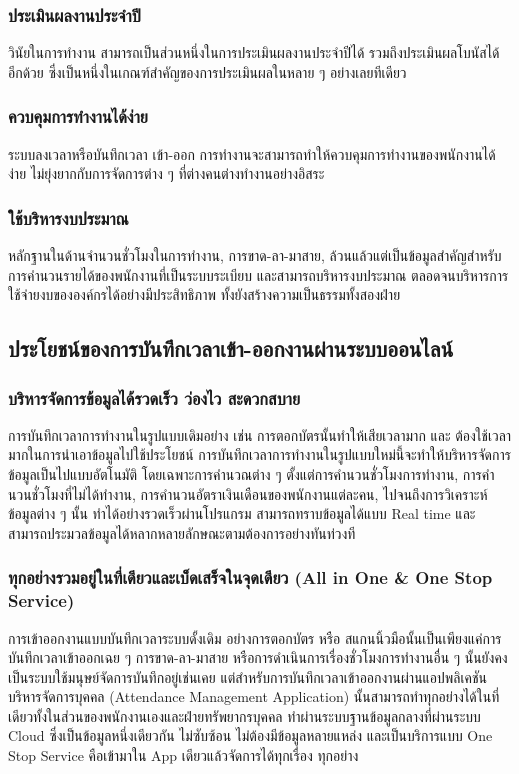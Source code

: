 \subsubsection{ประเมินผลงานประจำปี}
\quad วินัยในการทำงาน สามารถเป็นส่วนหนึ่งในการประเมินผลงานประจำปีได้ รวมถึงประเมินผลโบนัสได้อีกด้วย ซึ่งเป็นหนึ่งในเกณฑ์สำคัญของการประเมินผลในหลาย ๆ อย่างเลยทีเดียว 
\subsubsection{ควบคุมการทำงานได้ง่าย}
\quad ระบบลงเวลาหรือบันทึกเวลา เข้า-ออก การทำงานจะสามารถทำให้ควบคุมการทำงานของพนักงานได้ง่าย ไม่ยุ่งยากกับการจัดการต่าง ๆ ที่ต่างคนต่างทำงานอย่างอิสระ 
\subsubsection{ใช้บริหารงบประมาณ}
\quad หลักฐานในด้านจำนวนชั่วโมงในการทำงาน, การขาด-ลา-มาสาย, ล้วนแล้วแต่เป็นข้อมูลสำคัญสำหรับการคำนวนรายได้ของพนักงานที่เป็นระบบระเบียบ และสามารถบริหารงบประมาณ ตลอดจนบริหารการใช้จ่ายงบขององค์กรได้อย่างมีประสิทธิภาพ ทั้งยังสร้างความเป็นธรรมทั้งสองฝ่าย 

\subsection{ประโยชน์ของการบันทึกเวลาเข้า-ออกงานผ่านระบบออนไลน์}
\subsubsection{บริหารจัดการข้อมูลได้รวดเร็ว ว่องไว สะดวกสบาย}
\quad การบันทึกเวลาการทำงานในรูปแบบเดิมอย่าง เช่น การตอกบัตรนั้นทำให้เสียเวลามาก และ ต้องใช้เวลามากในการนำเอาข้อมูลไปใช้ประโยชน์ การบันทึกเวลาการทำงานในรูปแบบใหม่นี้จะทำให้บริหารจัดการข้อมูลเป็นไปแบบอัตโนมัติ โดยเฉพาะการคำนวณต่าง ๆ ตั้งแต่การคำนวนชั่วโมงการทำงาน, การคำนวนชั่วโมงที่ไม่ได้ทำงาน, การคำนวนอัตราเงินเดือนของพนักงานแต่ละคน, ไปจนถึงการวิเคราะห์ข้อมูลต่าง ๆ นั้น ทำได้อย่างรวดเร็วผ่านโปรแกรม สามารถทราบข้อมูลได้แบบ Real time และสามารถประมวลข้อมูลได้หลากหลายลักษณะตามต้องการอย่างทันท่วงที 
\subsubsection{ทุกอย่างรวมอยู่ในที่เดียวและเบ็ดเสร็จในจุดเดียว (All in One \& One Stop Service)}
\quad การเข้าออกงานแบบบันทึกเวลาระบบดั้งเดิม อย่างการตอกบัตร หรือ สแกนนิ้วมือนั้นเป็นเพียงแค่การบันทึกเวลาเข้าออกเฉย ๆ การขาด-ลา-มาสาย หรือการดำเนินการเรื่องชั่วโมงการทำงานอื่น ๆ นั้นยังคงเป็นระบบใช้มนุษย์จัดการบันทึกอยู่เช่นเคย แต่สำหรับการบันทึกเวลาเข้าออกงานผ่านแอปพลิเคชันบริหารจัดการบุคคล (Attendance Management Application) นั้นสามารถทำทุกอย่างได้ในที่เดียวทั้งในส่วนของพนักงานเองและฝ่ายทรัพยากรบุคคล ทำผ่านระบบฐานข้อมูลกลางที่ผ่านระบบ Cloud ซึ่งเป็นข้อมูลหนึ่งเดียวกัน ไม่ซับซ้อน ไม่ต้องมีข้อมูลหลายแหล่ง และเป็นบริการแบบ One Stop Service คือเข้ามาใน App เดียวแล้วจัดการได้ทุกเรื่อง ทุกอย่าง 
